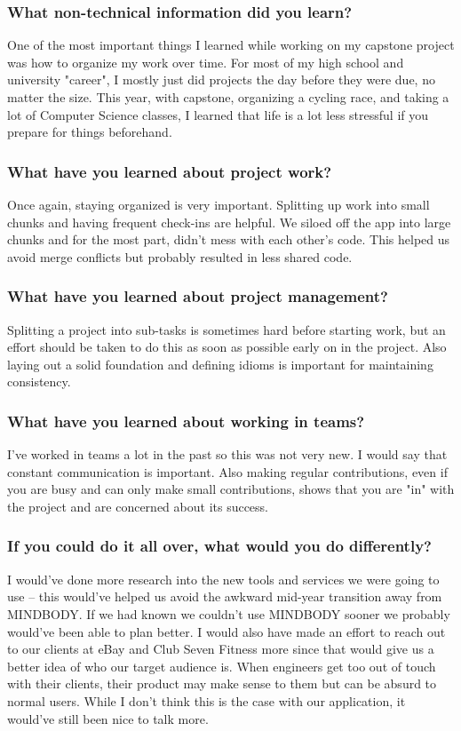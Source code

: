 \subsubsection{What non-technical information did you learn?}
One of the most important things I learned while working on my capstone project was how to organize my work over time. For most of my high school and university "career", I mostly just did projects the day before they were due, no matter the size. This year, with capstone, organizing a cycling race, and taking a lot of Computer Science classes, I learned that life is a lot less stressful if you prepare for things beforehand.

\subsubsection{What have you learned about project work?}
Once again, staying organized is very important. Splitting up work into small chunks and having frequent check-ins are helpful. We siloed off the app into large chunks and for the most part, didn't mess with each other's code. This helped us avoid merge conflicts but probably resulted in less shared code.

\subsubsection{What have you learned about project management?}
Splitting a project into sub-tasks is sometimes hard before starting work, but an effort should be taken to do this as soon as possible early on in the project. Also laying out a solid foundation and defining idioms is important for maintaining consistency.

\subsubsection{What have you learned about working in teams?}
I've worked in teams a lot in the past so this was not very new. I would say that constant communication is important. Also making regular contributions, even if you are busy and can only make small contributions, shows that you are "in" with the project and are concerned about its success.

\subsubsection{If you could do it all over, what would you do differently?}
I would've done more research into the new tools and services we were going to use – this would've helped us avoid the awkward mid-year transition away from MINDBODY. If we had known we couldn't use MINDBODY sooner we probably would've been able to plan better. I would also have made an effort to reach out to our clients at eBay and Club Seven Fitness more since that would give us a better idea of who our target audience is. When engineers get too out of touch with their clients, their product may make sense to them but can be absurd to normal users. While I don't think this is the case with our application, it would've still been nice to talk more.

